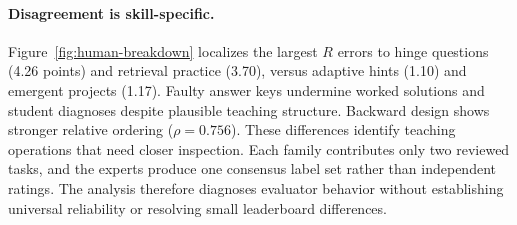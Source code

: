 \paragraph{Disagreement is skill-specific.}
Figure~\ref{fig:human-breakdown} localizes the largest $R$ errors to
hinge questions (4.26 points) and retrieval practice (3.70), versus adaptive
hints (1.10) and emergent projects (1.17). Faulty answer keys undermine
worked solutions and student diagnoses despite plausible teaching structure.
Backward design shows stronger relative ordering ($\rho=0.756$).
These differences identify teaching operations that need closer inspection.
Each family contributes only two reviewed tasks, and the experts produce
one consensus label set rather than independent ratings. The analysis
therefore diagnoses evaluator behavior without establishing universal
reliability or resolving small leaderboard differences.
